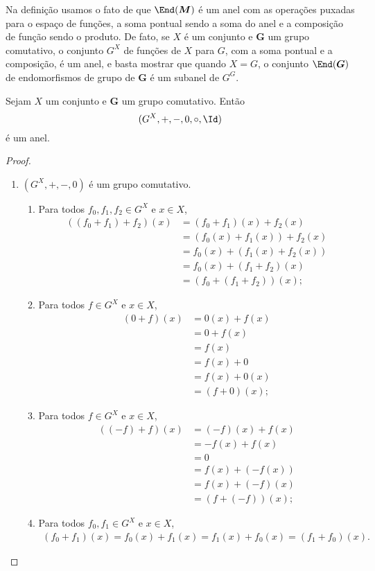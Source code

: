 Na definição usamos o fato de que $\End(\bm M)$ é um anel com as operações puxadas para o espaço de funções, a soma pontual sendo a soma do anel e a composição de função sendo o produto. De fato, se $X$ é um conjunto e $\bm G$ um grupo comutativo, o conjunto $G^X$ de funções de $X$ para $G$, com a soma pontual e a composição, é um anel, e basta mostrar que quando $X=G$, o conjunto $\End(\bm G)$ de endomorfismos de grupo de $\bm G$ é um subanel de $G^G$.

\begin{prop}
Sejam $X$ um conjunto e $\bm G$ um grupo comutativo. Então
	\begin{equation*}
	(G^X,+,-,0,\circ,\Id)
	\end{equation*}
é um anel.
\end{prop}
\begin{proof}
	\begin{enumerate}
	\item $(G^X,+,-,0)$ é um grupo comutativo.
		\begin{enumerate}
		\item Para todos $f_0,f_1,f_2 \in G^X$ e $x \in X$,
			\begin{align*}
			((f_0+f_1)+f_2)(x) &= (f_0+f_1)(x)+f_2(x) \\
				&= (f_0(x)+f_1(x))+f_2(x) \\
				&= f_0(x)+(f_1(x)+f_2(x)) \\
				&= f_0(x)+(f_1+f_2)(x) \\
				&= (f_0+(f_1+f_2))(x);
			\end{align*}
		\item Para todos $f \in G^X$ e $x \in X$,
			\begin{align*}
			(0+f)(x) &= 0(x)+f(x) \\
				&= 0+f(x) \\
				&= f(x) \\
				&= f(x)+0 \\
				&= f(x)+0(x) \\
				&= (f+0)(x);
			\end{align*}
		\item Para todos $f \in G^X$ e $x \in X$,
			\begin{align*}
			((-f)+f)(x) &= (-f)(x)+f(x) \\
				&= -f(x)+f(x) \\
				&= 0 \\
				&= f(x)+(-f(x)) \\
				&= f(x) + (-f)(x) \\
				&= (f+(-f))(x);				
			\end{align*}
		\item Para todos $f_0,f_1 \in G^X$ e $x \in X$,
			\begin{align*}
			(f_0+f_1)(x) = f_0(x)+f_1(x) = f_1(x) + f_0(x) = (f_1+f_0)(x).
			\end{align*}
		\end{enumerate}
	

\end{enumerate}
\end{proof}
